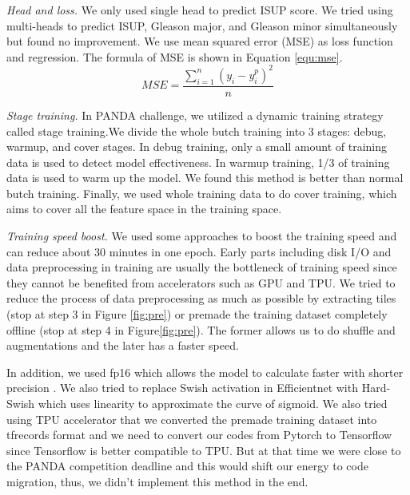 \documentclass{article}
\begin{document}
\textit{Head and loss.} We only used single head to predict ISUP score. We tried using multi-heads to predict ISUP, Gleason major, and Gleason minor simultaneously but found no improvement. We use mean squared error (MSE) as loss function and regression. The formula of MSE is shown in Equation \ref{equ:mse}.
\begin{equation}
MSE = \frac{\sum_{i=1}^n(y_i - y_i^p)^2}{n}
\label{equ:mse}
\end{equation}





\textit{Stage training.} In PANDA challenge, we utilized a dynamic training strategy called stage training.We divide the whole butch training into 3 stages: debug, warmup, and cover stages. In debug training, only a small amount of training data is used to detect model effectiveness. In warmup training, 1/3 of training data is used to warm up the model. We found this method is better than normal butch training. Finally, we used whole training data to do cover training, which aims to cover all the feature space in the training space. 

\textit{Training speed boost.} We used some approaches to boost the training speed and can reduce about 30 minutes in one epoch. Early parts including disk I/O and data preprocessing in training are usually the bottleneck of training speed since they cannot be benefited from accelerators such as GPU and TPU. We tried to reduce the process of data preprocessing as much as possible by extracting tiles (stop at step 3 in Figure \ref{fig:pre}) or premade the training dataset completely offline (stop at step 4 in Figure\ref{fig:pre}). The former allows us to do shuffle and augmentations and the later has a faster speed.  \par
In addition, we used fp16 which allows the model to calculate faster with shorter precision \citep{haidar2018harnessing}. We also tried to replace Swish activation \citep{ramachandran2017swish} in Efficientnet with Hard-Swish \citep{howard2019searching} which uses linearity to approximate the curve of sigmoid. We also tried using TPU accelerator that we converted the premade training dataset into tfrecords format and we need to convert our codes from Pytorch to Tensorflow since Tensorflow is better compatible to TPU. But at that time we were close to the PANDA competition deadline and this would shift our energy to code migration, thus, we didn't implement this method in the end. 
\end{document}
